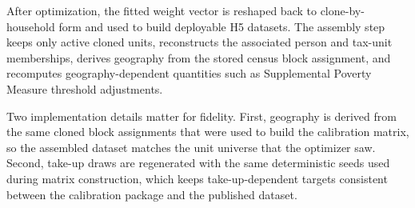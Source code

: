 After optimization, the fitted weight vector is reshaped back to clone-by-household form and used
to build deployable H5 datasets. The assembly step keeps only active cloned units, reconstructs the
associated person and tax-unit memberships, derives geography from the stored census block
assignment, and recomputes geography-dependent quantities such as Supplemental Poverty Measure
threshold adjustments.

Two implementation details matter for fidelity. First, geography is derived from the same cloned
block assignments that were used to build the calibration matrix, so the assembled dataset matches
the unit universe that the optimizer saw. Second, take-up draws are regenerated with the same
deterministic seeds used during matrix construction, which keeps take-up-dependent targets
consistent between the calibration package and the published dataset.
